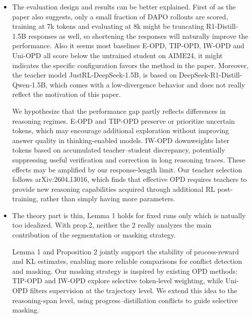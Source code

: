 \begin{itemize}
\item The evaluation design and results can be better explained. First of as the paper also suggests, only a small fraction of DAPO rollouts are scored, training at 7k tokens and evaluating at 8k might be truncating R1-Distill-1.5B responses as well, so shortening the responses will naturally improve the performance. Also it seems most baselines E-OPD, TIP-OPD, IW-OPD and Uni-OPD all score below the untrained student on AIME24, it might indicates the specific configuration favors the method in the paper. Moreover, the teacher model JustRL-DeepSeek-1.5B, is based on DeepSeek-R1-Distill-Qwen-1.5B, which comes with a low-divergence behavior and does not really reflect the motivation of this paper.
\par{}
\begin{responsebox}[frametitle={Response to W3}]
We hypothesize that the performance gap partly reflects differences in reasoning regimes. E-OPD and TIP-OPD preserve or prioritize uncertain tokens, which may encourage additional exploration without improving answer quality in thinking-enabled models. IW-OPD downweights later tokens based on accumulated teacher--student discrepancy, potentially suppressing useful verification and correction in long reasoning traces. These effects may be amplified by our response-length limit. Our teacher selection follows arXiv:2604.13016, which finds that effective OPD requires teachers to provide new reasoning capabilities acquired through additional RL post-training, rather than simply having more parameters.
\end{responsebox}

\item The theory part is thin, Lemma 1 holds for fixed runs only which is natually too idealized. With prop.2, neither the 2 really analyzes the main contribution of the segmentation or masking strategy.
\par{}
\begin{responsebox}[frametitle={Response to W4}]
Lemma 1 and Proposition 2 jointly support the stability of process-reward and KL estimates, enabling more reliable comparisons for conflict detection and masking. Our masking strategy is inspired by existing OPD methods: TIP-OPD and IW-OPD explore selective token-level weighting, while Uni-OPD filters supervision at the trajectory level. We extend this idea to the reasoning-span level, using progress--distillation conflicts to guide selective masking.
\end{responsebox}

\end{itemize}


